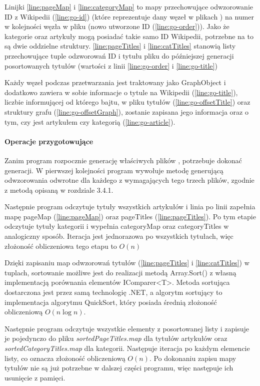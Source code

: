Linijki \ref{line:pageMap} i \ref{line:categoryMap} to mapy przechowujące odwzorowanie ID z Wikipedii (\ref{line:go-id}) (które reprezentuje dany węzeł w plikach ) na numer w kolejności węzła w pliku  (nowo utworzone ID (\ref{line:go-order})). Jako że kategorie oraz artykuły mogą posiadać takie samo ID Wikipedii, potrzebne na to są dwie oddzielne struktury. \ref{line:pageTitles} i \ref{line:catTitles} stanowią listy przechowujące tuple odzworowań ID i tytułu pliku do późniejszej generacji posortowanych tytułów (wartości z linii \ref{line:go-order} i \ref{line:go-title})

Każdy węzeł podczas przetwarzania jest traktowany jako GraphObject i dodatkowo zawiera w sobie informacje o tytule na Wikipedii (\ref{line:go-title}), liczbie informującej od którego bajtu, w pliku tytułów  (\ref{line:go-offsetTitle}) oraz struktury grafu  (\ref{line:go-offsetGraph}), zostanie zapisana jego informacja oraz o tym, czy jest artykułem czy kategorią (\ref{line:go-article}).

\paragraph{Operacje przygotowujące}
Zanim program rozpocznie generację właściwych plików , potrzebuje dokonać generacji. W pierwszej kolejności program wywołuje metodę generującą odwzorowania odwrotne dla każdego z wymagających tego trzech plików, zgodnie z metodą opisaną w rozdziale 3.4.1.

Następnie program odczytuje tytuły wszystkich artykułów i linia po linii zapełnia mapę pageMap (\ref{line:pageMap}) oraz pageTitles (\ref{line:pageTitles}). Po tym etapie odczytuje tytuły kategorii i wypełnia categoryMap oraz categoryTitles w analogiczny sposób. Iteracja jest jednorazowa po wszystkich tytułach, więc złożoność obliczeniowa tego etapu to $O(n)$

Dzięki zapisaniu map odwzorowań tytułów (\ref{line:pageTitles} i \ref{line:catTitles}) w tuplach, sortowanie możliwe jest do realizacji metodą Array.Sort() z własną implementacją porównania elementów IComparer<T>. Metoda sortująca dostarczona jest przez samą technologię .NET, a algorytm sortujący to implementacja algorytmu QuickSort, który posiada średnią złożoność obliczeniową $O(n\log n)$.

Następnie program odczytuje wszystkie elementy z posortowanej listy i zapisuje je pojedynczo do pliku \textit{sortedPageTitles.map} dla tytułów artykułów oraz \textit{sortedCategoryTitles.map} dla kategorii. Następuje iteracja po każdym elemencie listy, co oznacza złożoność obliczeniową $O(n)$. Po dokonaniu zapisu mapy tytułów nie są już potrzebne w dalszej części programu, więc następuje ich usunięcie z pamięci.

